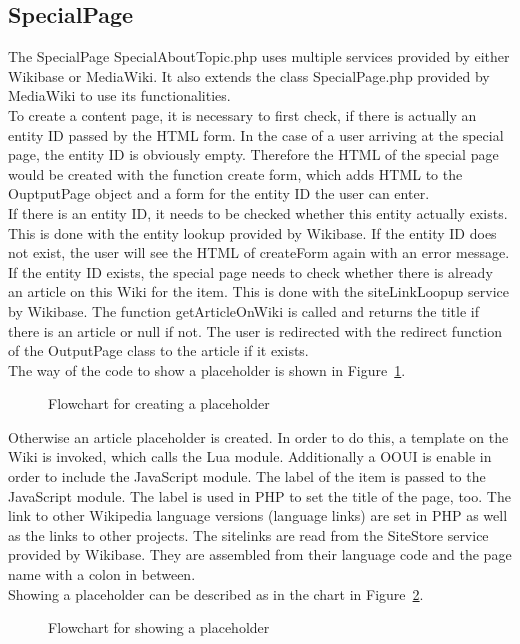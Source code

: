 \subsection{SpecialPage}

The SpecialPage SpecialAboutTopic.php uses multiple services provided by either Wikibase or MediaWiki. It also extends the class SpecialPage.php provided by MediaWiki to use its functionalities. \\
To create a content page, it is necessary to first check, if there is actually an entity ID passed by the HTML form. In the case of a user arriving at the special page, the entity ID is obviously empty. Therefore the HTML of the special page would be created with the function create form, which adds HTML to the OuptputPage object and a form for the entity ID the user can enter. \\
If there is an entity ID, it needs to be checked whether this entity actually exists. This is done with the entity lookup provided by Wikibase. If the entity ID does not exist, the user will see the HTML of createForm again with an error message.
If the entity ID exists, the special page needs to check whether there is already an article on this Wiki for the item. This is done with the siteLinkLoopup service by Wikibase. The function getArticleOnWiki is called and returns the title if there is an article or null if not. The user is redirected with the redirect function of the OutputPage class to the article if it exists.  \\
The way of the code to show a placeholder is shown in Figure~\ref{fig:createpl}. 
\begin{figure}[ht]
	\centering
	
	\caption{Flowchart for creating a placeholder}
	\label{fig:createpl}
\end{figure}

Otherwise an article placeholder is created. In order to do this, a template on the Wiki is invoked, which calls the Lua module. Additionally a OOUI is enable in order to include the JavaScript module. The label of the item is passed to the JavaScript module. The label is used in PHP to set the title of the page, too. The link to other Wikipedia language versions (language links) are set in PHP as well as the links to other projects. The sitelinks are read from the SiteStore service provided by Wikibase. They are assembled from their language code and the page name with a colon in between. \\
Showing a placeholder can be described as in the chart in Figure~\ref{fig:showpl}. 
\begin{figure}[ht]
	\centering
	
	\caption{Flowchart for showing a placeholder}
	\label{fig:showpl}
\end{figure}
